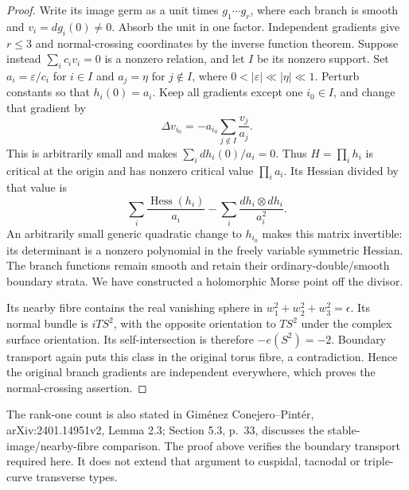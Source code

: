 \begin{proof}
Write its image germ as a unit times $g_1\cdots g_r$, where
each branch is smooth and $v_i=dg_i(0)\ne0$. Absorb the
unit in one factor. Independent gradients give $r\leq3$
and normal-crossing coordinates by the inverse function
theorem. Suppose instead $\sum_i c_iv_i=0$ is a nonzero
relation, and let $I$ be its nonzero support. Set
$a_i=\varepsilon/c_i$ for $i\in I$ and $a_j=\eta$ for
$j\notin I$, where $0<|\varepsilon|\ll|\eta|\ll1$.
Perturb constants so that $h_i(0)=a_i$. Keep all gradients
except one $i_0\in I$, and change that gradient by
\[
 \Delta v_{i_0}=-a_{i_0}\sum_{j\notin I}\frac{v_j}{a_j}.
\]
This is arbitrarily small and makes $\sum_i dh_i(0)/a_i=0$.
Thus $H=\prod_i h_i$ is critical at the origin and has
nonzero critical value $\prod_i a_i$. Its Hessian divided
by that value is
\[
 \sum_i\frac{\operatorname{Hess}(h_i)}{a_i}
 -\sum_i\frac{dh_i\otimes dh_i}{a_i^2}.
\]
An arbitrarily small generic quadratic change to $h_{i_0}$
makes this matrix invertible: its determinant is a nonzero
polynomial in the freely variable symmetric Hessian.
The branch functions remain smooth and retain their
ordinary-double/smooth boundary strata. We have constructed
a holomorphic Morse point off the divisor.

Its nearby fibre contains the real vanishing sphere in
$w_1^2+w_2^2+w_3^2=\epsilon$. Its normal bundle is
$iTS^2$, with the opposite orientation to $TS^2$ under the
complex surface orientation. Its self-intersection is
therefore $-e(S^2)=-2$. Boundary transport again puts this
class in the original torus fibre, a contradiction. Hence
the original branch gradients are independent everywhere,
which proves the normal-crossing assertion.
\end{proof}

The rank-one count is also stated in Gim\'enez Conejero--Pint\'er,
arXiv:2401.14951v2, Lemma 2.3; Section 5.3, p.~33,
discusses the stable-image/nearby-fibre comparison.
The proof above verifies the boundary transport required here.
It does not extend that argument to cuspidal, tacnodal or
triple-curve transverse types.


